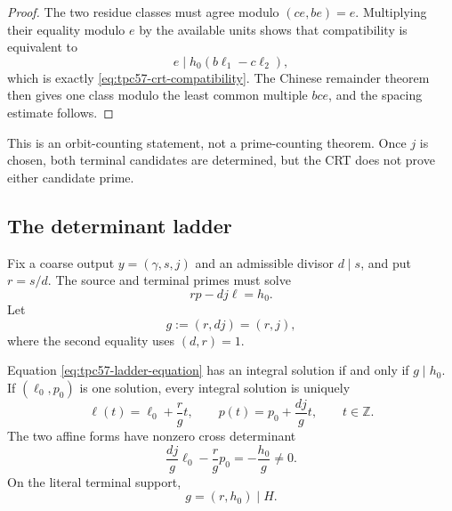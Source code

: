 \begin{proof}
The two residue classes must agree modulo
\((ce,be)=e\).  Multiplying their equality modulo \(e\) by the available
units shows that compatibility is equivalent to
\[
 e\mid h_0(b\ell_1-c\ell_2),
\]
which is exactly \eqref{eq:tpc57-crt-compatibility}.  The Chinese
remainder theorem then gives one class modulo the least common multiple
\(bce\), and the spacing estimate follows.
\end{proof}

This is an orbit-counting statement, not a prime-counting theorem.  Once
\(j\) is chosen, both terminal candidates are determined, but the CRT
does not prove either candidate prime.

\subsection{The determinant ladder}

Fix a coarse output \(y=(\gamma,s,j)\) and an admissible divisor
\(d\mid s\), and put \(r=s/d\).  The source and terminal primes must solve
\begin{equation}
 rp-dj\ell=h_0.
 \label{eq:tpc57-ladder-equation}
\end{equation}
Let
\begin{equation}
 g:=(r,dj)=(r,j),
 \label{eq:tpc57-ladder-gcd}
\end{equation}
where the second equality uses \((d,r)=1\).

\begin{proposition}
\label{prop:tpc57-two-affine-reduction}
Equation \eqref{eq:tpc57-ladder-equation} has an integral solution if and
only if \(g\mid h_0\).  If \((\ell_0,p_0)\) is one solution, every
integral solution is uniquely
\begin{equation}
 \boxed{
 \ell(t)=\ell_0+\frac r g t,
 \qquad
 p(t)=p_0+\frac{dj}{g}t,
 \qquad t\in\mathbb Z.}
 \label{eq:tpc57-two-affine-forms}
\end{equation}
The two affine forms have nonzero cross determinant
\begin{equation}
 \frac{dj}{g}\ell_0-\frac r g p_0
 =-\frac{h_0}{g}\ne0.
 \label{eq:tpc57-affine-determinant}
\end{equation}
On the literal terminal support,
\begin{equation}
 g=(r,h_0)\mid H.
 \label{eq:tpc57-literal-ladder-gcd}
\end{equation}
\end{proposition}

